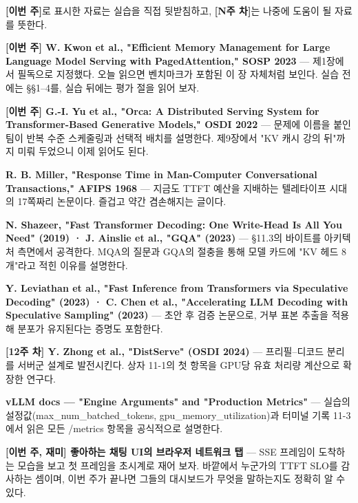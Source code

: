 \textbf{[이번 주]}로 표시한 자료는 실습을 직접 뒷받침하고, \textbf{[N주 차]}는 나중에 도움이 될 자료를 뜻한다.

\begin{tbbitemize}
  \item \textbf{[이번 주] W. Kwon et al., "Efficient Memory Management for Large Language Model Serving with PagedAttention," SOSP 2023} — 제1장에서 필독으로 지정했다. 오늘 읽으면 벤치마크가 포함된 이 장 자체처럼 보인다. 실습 전에는 §§1–4를, 실습 뒤에는 평가 절을 읽어 보자.
  \item \textbf{[이번 주] G.-I. Yu et al., "Orca: A Distributed Serving System for Transformer-Based Generative Models," OSDI 2022} — 문제에 이름을 붙인 팀이 반복 수준 스케줄링과 선택적 배치를 설명한다. 제9장에서 "KV 캐시 강의 뒤"까지 미뤄 두었으니 이제 읽어도 된다.
  \item \textbf{R. B. Miller, "Response Time in Man-Computer Conversational Transactions," AFIPS 1968} — 지금도 TTFT 예산을 지배하는 텔레타이프 시대의 17쪽짜리 논문이다. 즐겁고 약간 겸손해지는 글이다.
  \item \textbf{N. Shazeer, "Fast Transformer Decoding: One Write-Head Is All You Need" (2019) · J. Ainslie et al., "GQA" (2023)} — §11.3의 바이트를 아키텍처 측면에서 공격한다. MQA의 질문과 GQA의 절충을 통해 모델 카드에 "KV 헤드 8개"라고 적힌 이유를 설명한다.
  \item \textbf{Y. Leviathan et al., "Fast Inference from Transformers via Speculative Decoding" (2023) · C. Chen et al., "Accelerating LLM Decoding with Speculative Sampling" (2023)} — 초안 후 검증 논문으로, 거부 표본 추출을 적용해 분포가 유지된다는 증명도 포함한다.
  \item \textbf{[12주 차] Y. Zhong et al., "DistServe" (OSDI 2024)} — 프리필–디코드 분리를 서버군 설계로 발전시킨다. 상자 11-1의 첫 항목을 GPU당 유효 처리량 계산으로 확장한 연구다.
  \item \textbf{vLLM docs — "Engine Arguments" and "Production Metrics"} — 실습의 설정값(max\_num\_batched\_tokens, gpu\_memory\_utilization)과 터미널 기록 11-3에서 읽은 모든 /metrics 항목을 공식적으로 설명한다.
  \item \textbf{[이번 주, 재미] 좋아하는 채팅 UI의 브라우저 네트워크 탭} — SSE 프레임이 도착하는 모습을 보고 첫 프레임을 초시계로 재어 보자. 바깥에서 누군가의 TTFT SLO를 감사하는 셈이며, 이번 주가 끝나면 그들의 대시보드가 무엇을 말하는지도 정확히 알 수 있다.
\end{tbbitemize}

\vspace{5.0pt}

